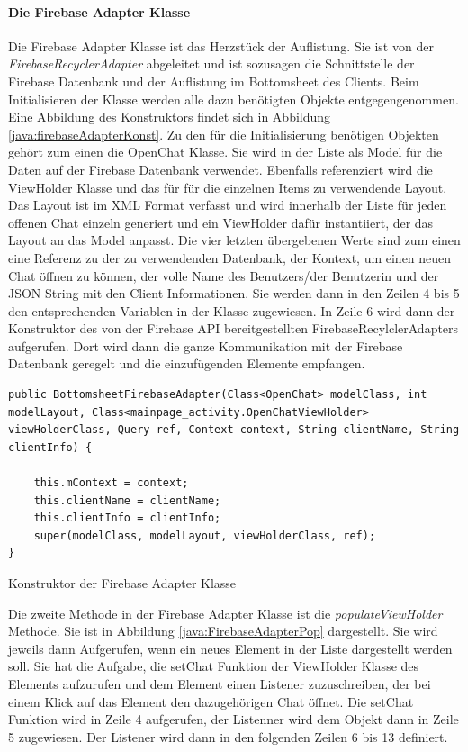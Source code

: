 \documentclass[a4paper,11pt]{report}
\newenvironment{code}{\captionsetup{type=figure}}{}
\begin{document}
			\paragraph{Die Firebase Adapter Klasse}\label{firebaseAdapter}		
			Die Firebase Adapter Klasse ist das Herzstück der Auflistung. Sie ist von der \emph{FirebaseRecyclerAdapter} abgeleitet und ist sozusagen die Schnittstelle der Firebase Datenbank und der Auflistung im Bottomsheet des Clients. Beim Initialisieren der Klasse werden alle dazu benötigten Objekte entgegengenommen. Eine Abbildung des Konstruktors findet sich in Abbildung \ref{java:firebaseAdapterKonst}. Zu den für die Initialisierung benötigen Objekten gehört zum einen die OpenChat Klasse. Sie wird in der Liste als Model für die Daten auf der Firebase Datenbank verwendet. Ebenfalls referenziert wird die ViewHolder Klasse und das für für die einzelnen Items zu verwendende Layout. Das Layout ist im XML Format verfasst und wird innerhalb der Liste für jeden offenen Chat einzeln generiert und ein ViewHolder dafür instantiiert, der das Layout an das Model anpasst. Die vier letzten übergebenen Werte sind zum einen eine Referenz zu der zu verwendenden Datenbank, der Kontext, um einen neuen Chat öffnen zu können, der volle Name des Benutzers/der Benutzerin und der JSON String mit den Client Informationen. Sie werden dann in den Zeilen 4 bis 5 den entsprechenden Variablen in der Klasse zugewiesen. In Zeile 6 wird dann der Konstruktor des von der Firebase API bereitgestellten FirebaseRecylclerAdapters aufgerufen. Dort wird dann die ganze Kommunikation mit der Firebase Datenbank geregelt und die einzufügenden Elemente empfangen.
\begin{code}
	\begin{center}
		\begin{verbatim}
public BottomsheetFirebaseAdapter(Class<OpenChat> modelClass, int modelLayout, Class<mainpage_activity.OpenChatViewHolder> viewHolderClass, Query ref, Context context, String clientName, String clientInfo) {
	
	this.mContext = context;
	this.clientName = clientName;
	this.clientInfo = clientInfo;
	super(modelClass, modelLayout, viewHolderClass, ref);
}
		\end{verbatim}
		\caption{Konstruktor der Firebase Adapter Klasse}\label{java:firebaseAdapterKonst}
	\end{center}
\end{code}

			Die zweite Methode in der Firebase Adapter Klasse ist die \emph{populateViewHolder} Methode. Sie ist in Abbildung \ref{java:FirebaseAdapterPop} dargestellt. Sie wird jeweils dann Aufgerufen, wenn ein neues Element in der Liste dargestellt werden soll. Sie hat die Aufgabe, die setChat Funktion der ViewHolder Klasse des Elements aufzurufen und dem Element einen Listener zuzuschreiben, der bei einem Klick auf das Element den dazugehörigen Chat öffnet. Die setChat Funktion wird in Zeile 4 aufgerufen, der Listenner wird dem Objekt dann in Zeile 5 zugewiesen. Der Listener wird dann in den folgenden Zeilen 6 bis 13 definiert.
			
\end{document}
